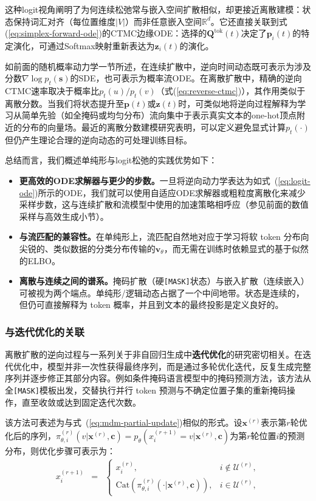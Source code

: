 \documentclass[UTF8,a4paper,zihao=-4,oneside,openany]{ctexbook}
\begin{document}
这种logit视角阐明了为何连续松弛常与嵌入空间扩散相似，却更接近离散建模：状态保持词汇对齐（每位置维度$|V|$）而非任意嵌入空间$\mathbb{R}^d$。它还直接关联到式(\ref{eq:simplex-forward-ode})的CTMC边缘ODE：选择的$\mathbf{Q}^{\mathrm{tok}}(t)$决定了$\mathbf{p}_i(t)$的特定演化，可通过Softmax映射重新表达为$\mathbf{z}_i(t)$的演化。

如前面的随机概率动力学一节所述，在连续扩散中，逆向时间动态既可表示为涉及分数$\nabla \log p_t(\mathbf{s})$的SDE，也可表示为概率流ODE。在离散扩散中，精确的逆向CTMC速率取决于概率比$p_t(u)/p_t(v)$（式(\ref{eq:reverse-ctmc})），其作用类似于离散分数。当我们将状态提升至$\mathbf{p}(t)$或$\mathbf{z}(t)$时，可类似地将逆向过程解释为学习从简单先验（如全掩码或均匀分布）流向集中于表示真实文本的one-hot顶点附近的分布的向量场。最近的离散分数建模研究表明，可以定义避免显式计算$p_t(\cdot)$但仍产生理论合理的逆向动态的可处理训练目标\citep{hoogeboom-etal:2021argmax,lou-etal:2024discrete}。

总结而言，我们概述单纯形与logit松弛的实践优势如下：
\begin{itemize}
\item \textbf{更高效的ODE求解器与更少的步数。}一旦将逆向动力学表达为如式~(\ref{eq:logit-ode})所示的ODE，我们就可以使用自适应ODE求解器或粗粒度离散化来减少采样步数，这与连续扩散和流模型中使用的加速策略相呼应（参见前面的数值采样与高效生成小节）。
\item \textbf{与流匹配的兼容性。}在单纯形上，流匹配自然地对应于学习将软 token 分布向尖锐的、类似数据的分类分布传输的$\mathbf{v}_\theta$，而无需在训练时依赖显式的基于似然的ELBO。
\item \textbf{离散与连续之间的谱系。}掩码扩散（硬\texttt{[MASK]}状态）与嵌入扩散（连续嵌入）可被视为两个端点。单纯形/逻辑动态占据了一个中间地带。状态是连续的，但仍可直接解释为 token 概率，并且到文本的最终投影是定义良好的。
\end{itemize}
\subsubsection{与迭代优化的关联}

离散扩散的逆向过程与一系列关于非自回归生成中\textbf{迭代优化}的研究密切相关\citep{lee-etal:2018deterministic}。在迭代优化中，模型并非一次性获得最终序列，而是通过多轮优化迭代，反复生成完整序列并逐步修正其部分内容。例如条件掩码语言模型中的掩码预测方法，该方法从全\texttt{[MASK]}模板出发，交替执行并行 token 预测与不确定位置子集的重新掩码操作，直至收敛或达到固定迭代次数\citep{ghazvininejad-etal:2019mask}。

该方法可表述为与式~(\ref{eq:mdm-partial-update})相似的形式。设$\mathbf{x}^{(r)}$表示第$r$轮优化后的序列，$\pi_{\theta,i}^{(r)}(v | \mathbf{x}^{(r)},\mathbf{c})=p_{\theta}(x_i^{(r+1)} = v | \mathbf{x}^{(r)},\mathbf{c})$为第$r$轮位置$i$的预测分布，则优化步骤可表示为：
\begin{eqnarray}
x_i^{(r+1)} & = &
\begin{cases}
x_i^{(r)}, & i\notin \mathcal{U}^{(r)},\\
\mathrm{Cat}\left(\pi^{(r)}_{\theta,i}(\cdot | \mathbf{x}^{(r)},\mathbf{c})\right), & i\in \mathcal{U}^{(r)},
\end{cases}
\label{eq:iterref-update}
\end{eqnarray}
\end{document}
